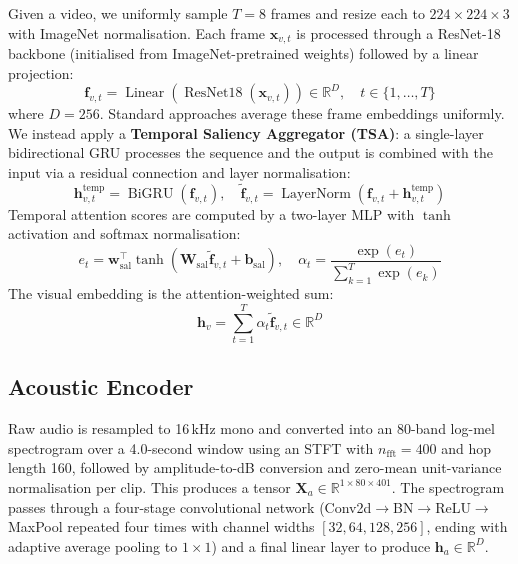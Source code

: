 \documentclass[conference]{IEEEtran}
\begin{document}
Given a video, we uniformly sample $T = 8$ frames and resize each to $224 \times 224 \times 3$ with ImageNet normalisation. Each frame $\mathbf{x}_{v,t}$ is processed through a ResNet-18 backbone (initialised from ImageNet-pretrained weights) followed by a linear projection:
\begin{equation}
\mathbf{f}_{v,t} = \operatorname{Linear}(\operatorname{ResNet18}(\mathbf{x}_{v,t})) \in \mathbb{R}^D, \quad t \in \{1, \dots, T\}
\end{equation}
where $D = 256$. Standard approaches average these frame embeddings uniformly. We instead apply a \textbf{Temporal Saliency Aggregator (TSA)}: a single-layer bidirectional GRU processes the sequence and the output is combined with the input via a residual connection and layer normalisation:
\begin{equation}
\mathbf{h}_{v,t}^{\mathrm{temp}} = \operatorname{BiGRU}(\mathbf{f}_{v,t}), \quad \tilde{\mathbf{f}}_{v,t} = \operatorname{LayerNorm}(\mathbf{f}_{v,t} + \mathbf{h}_{v,t}^{\mathrm{temp}})
\end{equation}
Temporal attention scores are computed by a two-layer MLP with $\tanh$ activation and softmax normalisation:
\begin{equation}
e_t = \mathbf{w}_{\mathrm{sal}}^\top \tanh(\mathbf{W}_{\mathrm{sal}} \tilde{\mathbf{f}}_{v,t} + \mathbf{b}_{\mathrm{sal}}), \quad \alpha_t = \frac{\exp(e_t)}{\sum_{k=1}^T \exp(e_k)}
\end{equation}
The visual embedding is the attention-weighted sum:
\begin{equation}
\mathbf{h}_v = \sum_{t=1}^T \alpha_t \tilde{\mathbf{f}}_{v,t} \in \mathbb{R}^D
\end{equation}

\subsection{Acoustic Encoder}

Raw audio is resampled to 16\,kHz mono and converted into an 80-band log-mel spectrogram over a 4.0-second window using an STFT with $n_{\mathrm{fft}} = 400$ and hop length 160, followed by amplitude-to-dB conversion and zero-mean unit-variance normalisation per clip. This produces a tensor $\mathbf{X}_a \in \mathbb{R}^{1 \times 80 \times 401}$. The spectrogram passes through a four-stage convolutional network (Conv2d$\rightarrow$BN$\rightarrow$ReLU$\rightarrow$MaxPool repeated four times with channel widths $[32, 64, 128, 256]$, ending with adaptive average pooling to $1 \times 1$) and a final linear layer to produce $\mathbf{h}_a \in \mathbb{R}^D$.
\end{document}
